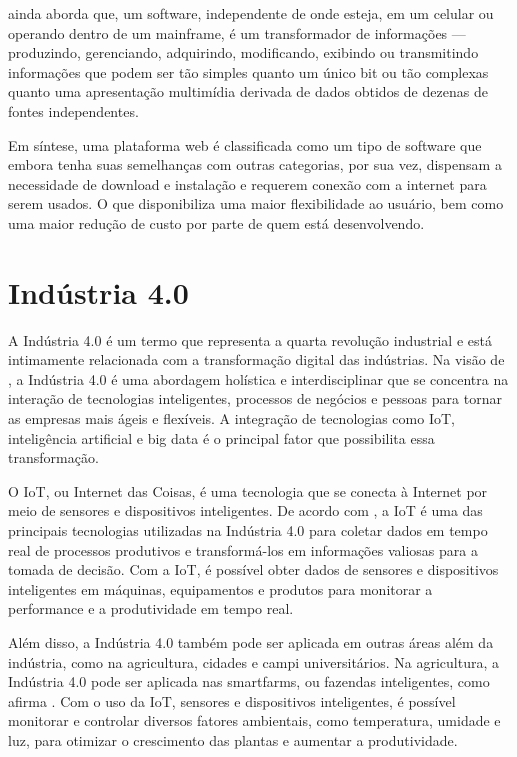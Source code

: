 \documentclass[tcc,capa]{texufpel}
\begin{document}
 \citet{PRESSMAN:2016} ainda aborda que, um software, independente de onde esteja, em um celular ou operando dentro de um mainframe, é um transformador de informações — produzindo, gerenciando, adquirindo, modificando, exibindo ou transmitindo informações que podem ser tão simples quanto um único bit ou tão complexas quanto uma apresentação multimídia derivada de dados obtidos de dezenas de fontes independentes.

Em síntese, uma plataforma web é classificada como um tipo de software que embora tenha suas semelhanças com outras categorias, por sua vez, dispensam a necessidade de download e instalação e requerem conexão com a internet para serem usados. O que disponibiliza uma maior flexibilidade ao usuário, bem como uma maior redução de custo por parte de quem está desenvolvendo. 
\section{Indústria 4.0}
A Indústria 4.0 é um termo que representa a quarta revolução industrial e está intimamente relacionada com a transformação digital das indústrias. Na visão de \citet{Pfeiffer:2018}, a Indústria 4.0 é uma abordagem holística e interdisciplinar que se concentra na interação de tecnologias inteligentes, processos de negócios e pessoas para tornar as empresas mais ágeis e flexíveis. A integração de tecnologias como IoT, inteligência artificial e big data é o principal fator que possibilita essa transformação.

O IoT, ou Internet das Coisas, é uma tecnologia que se conecta à Internet por meio de sensores e dispositivos inteligentes. De acordo com \citet{DeMasi:2019}, a IoT é uma das principais tecnologias utilizadas na Indústria 4.0 para coletar dados em tempo real de processos produtivos e transformá-los em informações valiosas para a tomada de decisão. Com a IoT, é possível obter dados de sensores e dispositivos inteligentes em máquinas, equipamentos e produtos para monitorar a performance e a produtividade em tempo real.

Além disso, a Indústria 4.0 também pode ser aplicada em outras áreas além da indústria, como na agricultura, cidades e campi universitários. Na agricultura, a Indústria 4.0 pode ser aplicada nas smartfarms, ou fazendas inteligentes, como afirma \citet{Silva:2018}. Com o uso da IoT, sensores e dispositivos inteligentes, é possível monitorar e controlar diversos fatores ambientais, como temperatura, umidade e luz, para otimizar o crescimento das plantas e aumentar a produtividade.
\end{document}
